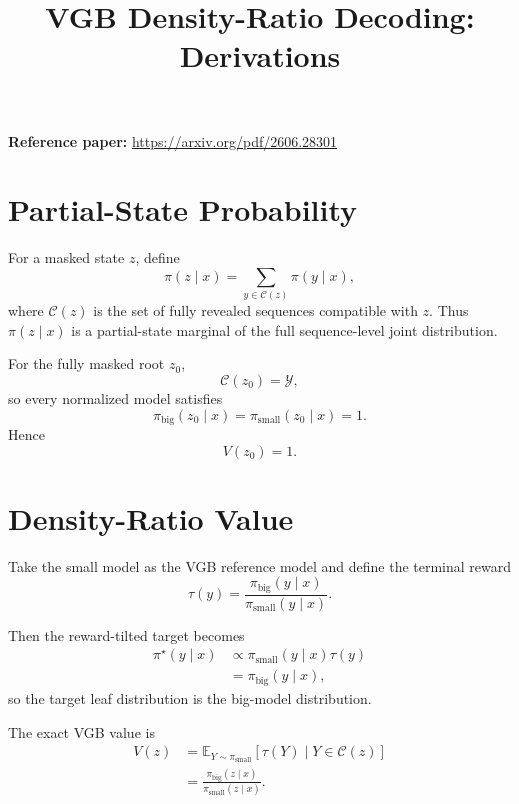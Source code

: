 \documentclass[11pt]{article}
\title{VGB Density-Ratio Decoding: Derivations}
\author{}
\date{}
\newcommand{\pb}{\pi_{\mathrm{big}}}
\newcommand{\ps}{\pi_{\mathrm{small}}}
\newcommand{\Y}{\mathcal{Y}}
\newcommand{\C}{\mathcal{C}}
\begin{document}
\maketitle

\noindent\textbf{Reference paper:} \href{https://arxiv.org/pdf/2606.28301}{https://arxiv.org/pdf/2606.28301}

\section{Partial-State Probability}

For a masked state $z$, define
\begin{equation}
\pi(z\mid x)
=
\sum_{y\in\C(z)}\pi(y\mid x),
\end{equation}
where $\C(z)$ is the set of fully revealed sequences compatible with $z$.
Thus $\pi(z\mid x)$ is a partial-state marginal of the full sequence-level joint distribution.

For the fully masked root $z_0$,
\begin{equation}
\C(z_0)=\Y,
\end{equation}
so every normalized model satisfies
\begin{equation}
\pb(z_0\mid x)=\ps(z_0\mid x)=1.
\end{equation}
Hence
\begin{equation}
V(z_0)=1.
\end{equation}

\section{Density-Ratio Value}

Take the small model as the VGB reference model and define the terminal reward
\begin{equation}
\tau(y)
=
\frac{\pb(y\mid x)}{\ps(y\mid x)}.
\end{equation}

Then the reward-tilted target becomes
\begin{align}
\pi^\star(y\mid x)
&\propto
\ps(y\mid x)\tau(y)\\
&=
\pb(y\mid x),
\end{align}
so the target leaf distribution is the big-model distribution.

The exact VGB value is
\begin{align}
V(z)
&=
\mathbb{E}_{Y\sim\ps}
\left[
\tau(Y)\mid Y\in\C(z)
\right]\\
&=
\frac{\pb(z\mid x)}{\ps(z\mid x)}.
\end{align}
\end{document}
